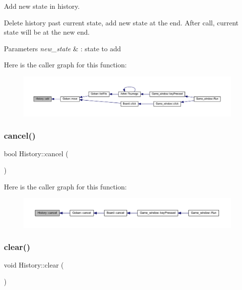 Add new state in history. 

Delete history past current state, add new state at the end. After call, current state will be at the new end.


\begin{DoxyParams}{Parameters}
{\em new\+\_\+state} & \+: state to add \\
\hline
\end{DoxyParams}
Here is the caller graph for this function\+:\nopagebreak
\begin{figure}[H]
\begin{center}
\leavevmode
\includegraphics[width=350pt]{class_history_a90222df7f73ae9cfda56bdb66cb1985e_icgraph}
\end{center}
\end{figure}
\mbox{\label{class_history_a6e1bcaa1d3ecc646131e6f73a2544f35}} 
\subsubsection{\texorpdfstring{cancel()}{cancel()}}
{\footnotesize\ttfamily bool History\+::cancel (\begin{DoxyParamCaption}{ }\end{DoxyParamCaption})}

Here is the caller graph for this function\+:\nopagebreak
\begin{figure}[H]
\begin{center}
\leavevmode
\includegraphics[width=350pt]{class_history_a6e1bcaa1d3ecc646131e6f73a2544f35_icgraph}
\end{center}
\end{figure}
\mbox{\label{class_history_a8ef13fdf00ec0786268fd6bd211bf38f}} 
\subsubsection{\texorpdfstring{clear()}{clear()}}
{\footnotesize\ttfamily void History\+::clear (\begin{DoxyParamCaption}{ }\end{DoxyParamCaption})}



